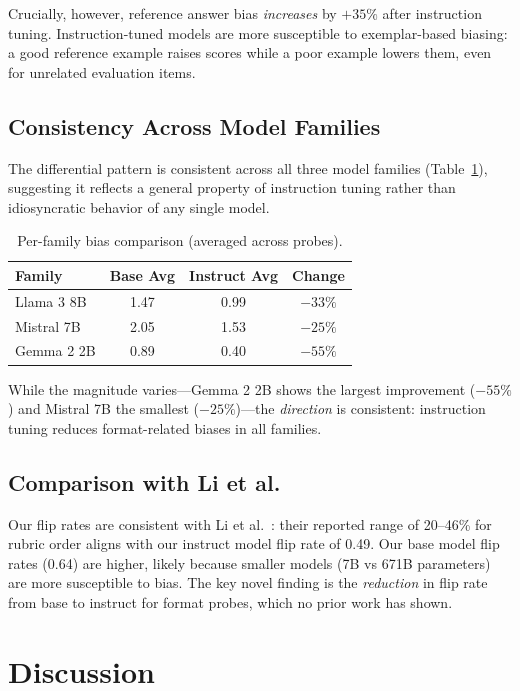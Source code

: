 \documentclass[11pt]{article}
\begin{document}
Crucially, however, reference answer bias \emph{increases} by $+35\%$ after instruction tuning. Instruction-tuned models are more susceptible to exemplar-based biasing: a good reference example raises scores while a poor example lowers them, even for unrelated evaluation items.

\subsection{Consistency Across Model Families}

The differential pattern is consistent across all three model families (Table~\ref{tab:families}), suggesting it reflects a general property of instruction tuning rather than idiosyncratic behavior of any single model.

\begin{table}[h]
\centering\small
\caption{Per-family bias comparison (averaged across probes).}
\label{tab:families}
\begin{tabular}{lccc}
\toprule
Family & Base Avg & Instruct Avg & Change \\
\midrule
Llama 3 8B & 1.47 & 0.99 & $-33\%$ \\
Mistral 7B & 2.05 & 1.53 & $-25\%$ \\
Gemma 2 2B & 0.89 & 0.40 & $-55\%$ \\
\bottomrule
\end{tabular}
\end{table}

While the magnitude varies---Gemma 2 2B shows the largest improvement ($-55\%$) and Mistral 7B the smallest ($-25\%$)---the \emph{direction} is consistent: instruction tuning reduces format-related biases in all families.

\subsection{Comparison with Li et al.}

Our flip rates are consistent with Li et al.~\cite{li2025scoring}: their reported range of 20--46\% for rubric order aligns with our instruct model flip rate of 0.49. Our base model flip rates (0.64) are higher, likely because smaller models (7B vs 671B parameters) are more susceptible to bias. The key novel finding is the \emph{reduction} in flip rate from base to instruct for format probes, which no prior work has shown.

\section{Discussion}
\end{document}
